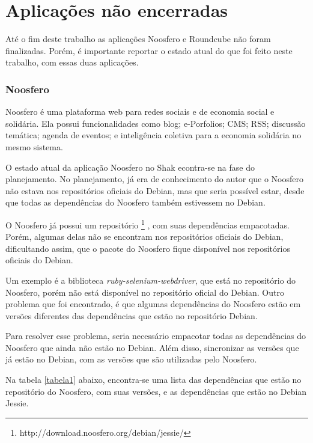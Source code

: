\section{Aplicações não encerradas}
\label{sub:appnencerradas}

Até o fim deste trabalho as aplicações Noosfero e Roundcube não foram finalizadas. 
Porém, é importante reportar o estado atual do que foi feito neste trabalho,
com essas duas aplicações.

\subsubsection{Noosfero}
\label{subsub:noosfero}

Noosfero  é uma plataforma web para redes sociais e 
de economia social e solidária. Ela possui funcionalidades como blog; e-Porfolios; 
CMS; RSS; discussão temática; agenda de eventos; e inteligência coletiva para a 
economia solidária no mesmo sistema.

O estado atual da aplicação Noosfero no Shak econtra-se
na fase do planejamento. No planejamento, já era de conhecimento do autor que o
Noosfero não estava nos repositórios oficiais do Debian, mas que seria possível estar, 
desde que todas as dependências do Noosfero também estivessem no Debian.

O Noosfero já possui um repositório \footnote{http://download.noosfero.org/debian/jessie/}
, com suas dependências empacotadas. Porém, algumas delas não se encontram nos repositórios
oficiais do Debian, dificultando assim, que o pacote do Noosfero fique disponível
nos repositórios oficiais do Debian. 

Um exemplo é a biblioteca \textit{ruby-selenium-webdriver}, que
está no repositório do Noosfero, porém não está disponível no repositório oficial
do Debian. Outro problema que foi encontrado, é que algumas dependências do Noosfero
estão em versões diferentes das dependências que estão no repositório Debian.

Para resolver esse problema, seria necessário empacotar todas as dependências
do Noosfero que ainda não estão no Debian. Além disso, sincronizar as versões
que já estão no Debian, com as versões que são utilizadas pelo Noosfero.

Na tabela \ref{tabela1} abaixo, encontra-se uma lista das dependências que estão no repositório do Noosfero,
com suas versões, e as dependências que estão no Debian Jessie.

